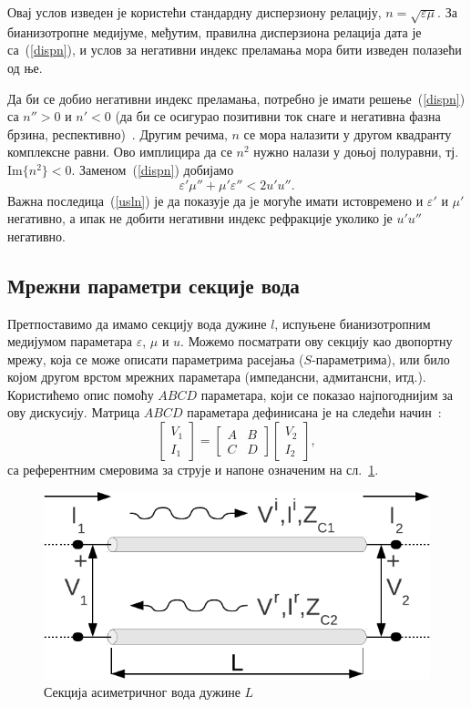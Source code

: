 Овај услов изведен је користећи стандардну дисперзиону релацију, $n=\sqrt{\varepsilon\mu}$. За бианизотропне медијуме, међутим, правилна дисперзиона релација дата је са~(\ref{dispn}), и услов за негативни индекс преламања мора бити изведен полазећи од ње.

Да би се добио негативни индекс преламања, потребно је имати решење~(\ref{dispn}) са $n''>0$ и $n'<0$ (да би се осигурао позитивни ток снаге и негативна фазна брзина, респективно)~\cite{mccall}. Другим речима, $n$ се мора налазити у другом квадранту комплексне равни. Ово имплицира да се $n^2$ нужно налази у доњој полуравни, тј. $\mathrm{Im}\{n^2\}<0$. Заменом~(\ref{dispn}) добијамо
\begin{equation}\label{usln}
\varepsilon'\mu''+\mu'\varepsilon'' < 2u'u''.
\end{equation}
Важна последица~(\ref{usln}) је да показује да је могуће имати истовремено и $\varepsilon'$ и $\mu'$ негативно, а ипак не добити негативни индекс рефракције уколико је $u'u''$ негативно.

\subsection{Мрежни параметри секције вода}
Претпоставимо да имамо секцију вода дужине $l$, испуњене бианизотропним медијумом параметара $\varepsilon$, $\mu$ и $u$. Можемо посматрати ову секцију као двопортну мрежу, која се може описати параметрима расејања ($S$-параметрима), или било којом другом врстом мрежних параметара (импедансни, адмитансни, итд.). Користићемо опис помоћу $ABCD$ параметара, који се показао најпогоднијим за ову дискусију. Матрица $ABCD$ параметара дефинисана је на следећи начин~\cite{Pozar:05}:
\begin{equation}\label{abcd_osn}
\begin{bmatrix} V_1 \\ I_1 \end{bmatrix} = 
\begin{bmatrix} A & B \\ C & D \end{bmatrix}
\begin{bmatrix} V_2 \\ I_2 \end{bmatrix},
\end{equation}
са референтним смеровима за струје и напоне означеним на сл.~\ref{fpole}.
\begin{figure}[!t]
\centering
\includegraphics[width=0.5\columnwidth]{slike/sekcija.pdf}
\caption{Секција асиметричног вода дужине $L$}
\label{fpole}
\end{figure}

